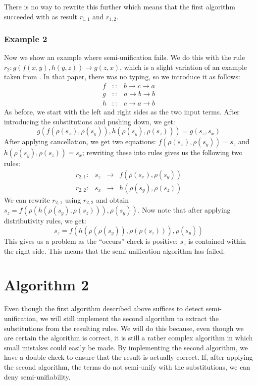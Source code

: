 There is no way to rewrite this further which means that the first algorithm succeeded with as result $r_{1,1}$ and $r_{1,2}$.

\subsubsection*{Example 2}
Now we show an example where semi-unification fails. We do this with the rule $r_2 : g(f(x, y), h(y, z)) \rightarrow g(z, x)$, which is a slight variation of an example taken from \cite{SemiUnification}. In that paper, there was no typing, so we introduce it as follows:
$$
\begin{array}{rcl}
    f & :: & b \rightarrow c \rightarrow a \\
    g & :: & a \rightarrow b \rightarrow b \\
    h & :: & c \rightarrow a \rightarrow b 
\end{array}
$$
As before, we start with the left and right sides as the two input terms. After introducing the substitutions and pushing down, we get:
$$g(f(\rho(s_x), \rho(s_y)), h(\rho(s_y), \rho(s_z))) = g(s_z, s_x)$$
After applying cancellation, we get two equations: $f(\rho(s_x), \rho(s_y)) = s_z$ and $h(\rho(s_y), \rho(s_z)) = s_x$; rewriting these into rules gives us the following two rules: 
$$
\begin{array}{lrcl}
    r_{2,1}: & s_z & \rightarrow & f(\rho(s_x), \rho(s_y)) \\
    r_{2,2}: & s_x & \rightarrow & h(\rho(s_y), \rho(s_z))
\end{array}
$$
We can rewrite $r_{2,1}$ using $r_{2,2}$ and obtain $s_z = f(\rho(h(\rho(s_y), \rho(s_z))), \rho(s_y))$. Now note that after applying distributivity rules, we get: $$s_z = f(h(\rho(\rho(s_y)), \rho(\rho(s_z))), \rho(s_y))$$
This gives us a problem as the ``occurs'' check is positive: $s_z$ is contained within the right side. This means that the semi-unification algorithm has failed.

\section{Algorithm 2} 
Even though the first algorithm described above suffices to detect semi-unification, we will still implement the second algorithm to extract the substitutions from the resulting rules. We will do this because, even though we are certain the algorithm is correct, it is still a rather complex algorithm in which small mistakes could easily be made. By implementing the second algorithm, we have a double check to ensure that the result is actually correct. If, after applying the second algorithm, the terms do not semi-unify with the substitutions, we can deny semi-unifiability.

